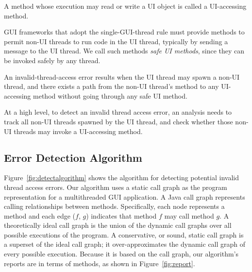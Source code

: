  { A method
whose execution may read or write a UI object is called a UI-accessing method.}\vspace{1mm}

 {GUI frameworks that
adopt the single-GUI-thread rule must provide methods to permit non-UI threads
to run code in the UI thread, typically by sending a message to the UI thread.
We call such methods \textit{safe UI methods}, since
they can be invoked safely by any thread.}\vspace{1mm}

 {An invalid-thread-access error results when the UI thread may spawn a non-UI thread, and there
exists a path from the non-UI thread's  method to any UI-accessing method
without going through any safe UI method. }\vspace{1mm}


At a high level, to detect an invalid thread access error, an analysis needs to track all
non-UI threads spawned by the UI thread, and check whether those non-UI threads
may invoke a UI-accessing method.

\tinystep

\subsection{Error Detection Algorithm}
\label{sec:algorithm}

Figure~\ref{fig:detectalgorithm} shows the algorithm for detecting
potential invalid thread access errors. Our algorithm uses a
static call graph as the program representation for a multithreaded
GUI application. A Java call graph represents calling relationships
between methods. Specifically, each node represents a method and each
edge ($f$, $g$) indicates that method $f$ may call method $g$.
A theoretically ideal call graph is the union of the
dynamic call graphs over all possible executions of the program. 
A conservative, or sound, static call graph is a superset of
the ideal call graph; it over-approximates the
dynamic call graph of every possible execution. 
Because it is 
based on the call graph, our algorithm's reports are in terms of methods, as shown in Figure~\ref{fig:report}.



